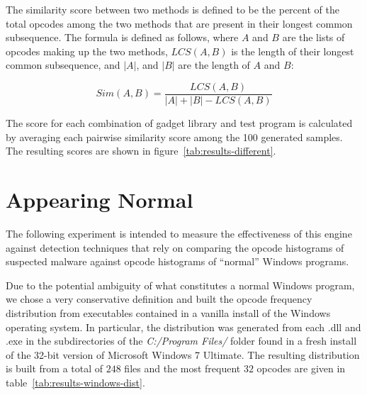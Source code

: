     The similarity score between two methods is defined to be the percent of
    the total opcodes among the two methods that are present in their longest
    common subsequence. The formula is defined as follows, where
    $A$ and $B$ are the lists of opcodes making up the two methods,
    $LCS(A,B)$ is the length of their longest common subsequence, and $|A|$,
    and $|B|$ are the length of $A$ and $B$:

    $$Sim(A,B) = \frac{LCS(A,B)}{|A| + |B| - LCS(A,B)}$$

    The score for each combination of gadget library and test program is
    calculated by averaging each pairwise similarity score among the 100
    generated samples.  The resulting scores are shown in
    figure~\ref{tab:results-different}. 

\section{Appearing Normal}

    The following experiment is intended to measure the effectiveness of
    this engine against detection techniques that rely on comparing the
    opcode histograms of suspected malware against opcode histograms of
    ``normal'' Windows programs.

    Due to the potential ambiguity of what constitutes a normal Windows
    program, we chose a very conservative definition and built the opcode
    frequency distribution from executables contained in a vanilla install
    of the Windows operating system. In particular, the distribution was
    generated from each {.dll} and {.exe} in the subdirectories of the
    \emph{C:/Program Files/} folder found in a fresh install of the 32-bit
    version of Microsoft Windows 7 Ultimate. The resulting distribution is
    built from a total of $248$ files and the most frequent $32$ opcodes are
    given in table~\ref{tab:results-windows-dist}.


